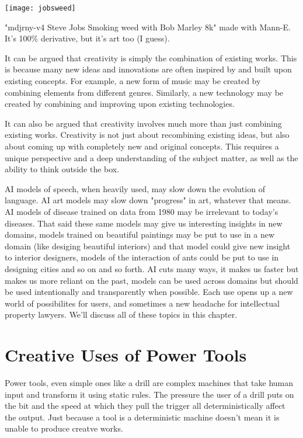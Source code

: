 \begin{marginfigure}[-5.5cm]
        \texttt{[image: jobsweed]}
        \caption{"mdjrny-v4 Steve Jobs Smoking weed with Bob Marley 8k" made with Mann-E. It's 100\% derivative, but it's art too (I guess).}
\end{marginfigure}

It can be argued that creativity is simply the combination of existing works. This is because many new ideas and innovations are often inspired by and built upon existing concepts. For example, a new form of music may be created by combining elements from different genres. Similarly, a new technology may be created by combining and improving upon existing technologies.

It can also be argued that creativity involves much more than just combining existing works. Creativity is not just about recombining existing ideas, but also about coming up with completely new and original concepts. This requires a unique perspective and a deep understanding of the subject matter, as well as the ability to think outside the box.  

AI models of speech, when heavily used, may slow down the evolution of language. AI art models may slow down "progress" in art, whatever that means. AI models of disease trained on data from 1980 may be irrelevant to today's diseases. That said these same models may give us interesting insights in new domains, models trained on beautiful paintings may be put to use in a new domain (like desiging beautiful interiors) and that model could give new insight to interior designers, models of the interaction of ants could be put to use in designing cities and so on and so forth. AI cuts many ways, it makes us faster but makes us more reliant on the past, models can be used across domains but should be used intentionally and transparently when possible. Each use opens up a new world of possibilites for users, and sometimes a new headache for intellectual property lawyers. We'll discuss all of these topics in this chapter.


\section{Creative Uses of Power Tools}

Power tools, even simple ones like a drill are complex machines that take human input and transform it using static rules. The pressure the user of a drill puts on the bit and the speed at which they pull the trigger all deterministically affect the output. Just because a tool is a deterministic machine doesn't mean it is unable to produce creatve works.

